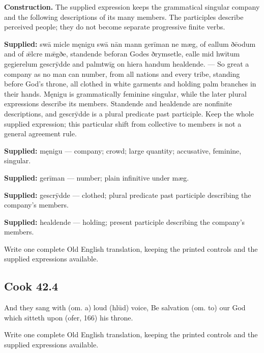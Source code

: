 \textbf{Construction.} The supplied expression keeps the grammatical singular company and the following descriptions of its many members. The participles describe perceived people; they do not become separate progressive finite verbs.

\textbf{Supplied:} swā micle męnigu swā nān mann gerīman ne mæg, of eallum ðēodum and of ǣlcre mǣgðe, standende beforan Godes ðrymsetle, ealle mid hwītum gegierelum gescrȳdde and palmtwīg on hiera handum healdende. — So great a company as no man can number, from all nations and every tribe, standing before God’s throne, all clothed in white garments and holding palm branches in their hands. Męnigu is grammatically feminine singular, while the later plural expressions describe its members. Standende and healdende are nonfinite descriptions, and gescrȳdde is a plural predicate past participle. Keep the whole supplied expression; this particular shift from collective to members is not a general agreement rule.

\textbf{Supplied:} męnigu — company; crowd; large quantity; accusative, feminine, singular.

\textbf{Supplied:} gerīman — number; plain infinitive under mæg.

\textbf{Supplied:} gescrȳdde — clothed; plural predicate past participle describing the company’s members.

\textbf{Supplied:} healdende — holding; present participle describing the company’s members.

Write one complete Old English translation, keeping the printed controls and the supplied expressions available.

\par\begin{minipage}{\linewidth}\raggedright
\subsection*{Cook 42.4}

And they sang with (om. a) loud (hlūd) voice, Be salvation (om. to) our God which sitteth upon (ofer, 166) his throne.

Write one complete Old English translation, keeping the printed controls and the supplied expressions available.

\end{minipage}\par\addvspace{4pt}

